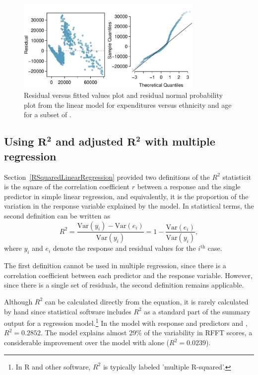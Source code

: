 \begin{figure}[h]
	\centering
	\includegraphics[width=0.8\textwidth]
	{ch_multiple_linear_regression_oi_biostat/figures/ddsAgeEthnicityResidNormPlot/ddsAgeEthnicityResidNormPlot.pdf}
	\caption{Residual versus fitted values plot and residual normal probability plot from the linear model for expenditures versus ethnicity and age for a subset of .}
	\label{ddsAgeEthnicityResidNormPlot}
\end{figure}



\textD{\newpage}


\subsection{Using $\pmb{R^2}$ and adjusted $\pmb{R^2}$ with multiple regression}

Section~\ref{RSquaredLinearRegression} provided two definitions of the $R^2$ statistic\textemdash it is the square of the correlation coefficient $r$ between a response and the single predictor in simple linear regression, and equivalently, it is the proportion of the variation in the response variable explained by the model.  In statistical terms, the second definition can be written as 
\[
   R^2 = \frac{\text{Var}(y_i) - \text{Var}(e_i)}
   {\text{Var}(y_i)} = 1 - \frac{\text{Var}(e_i)}{\text{Var}(y_i)},
   \label{RSquareDefinition}\]
where $y_i$ and $e_i$ denote the response and residual values for the
$i^{\text{th}}$ case.

The first definition cannot be used in multiple regression, since there is a correlation coefficient between each predictor and the response variable. However, since there is a single set of residuals, the second definition remains applicable. 

Although $R^2$ can be calculated directly from the equation, it is rarely calculated by hand since statistical software includes $R^2$ as a standard part of the summary output for a regression model.\footnote{In \textsf{R} and other software, $R^2$ is typically labeled 'multiple R-squared'.} In the model with response  and predictors  and , $R^2 = 0.2852$.  The model explains almost 29\% of the variability in RFFT scores, a considerable improvement over the model with  alone ($R^2 = 0.0239$).

